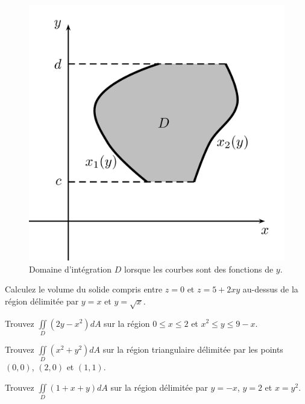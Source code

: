 \documentclass[]{book}
\theoremstyle{definition}
\theoremstyle{definition}
\theoremstyle{definition}
\theoremstyle{remark}
\let\BeginKnitrBlock\begin \let\EndKnitrBlock\end
\begin{document}
\begin{figure}

{\centering \includegraphics[width=0.75\linewidth]{resources/images/latex/itereeY} 

}

\caption{Domaine d'intégration $D$ lorsque les courbes sont des fonctions de $y$.}\label{fig:itereeY}
\end{figure}

\BeginKnitrBlock{example}
\protect\hypertarget{exm:unnamed-chunk-245}{}{\label{exm:unnamed-chunk-245}
}Calculez le volume du solide compris entre \(z=0\) et \(z=5+2xy\)
au-dessus de la région délimitée par \(y=x\) et \(y=\sqrt{x}\).
\EndKnitrBlock{example}
\vspace*{8cm}

\BeginKnitrBlock{example}
\protect\hypertarget{exm:unnamed-chunk-246}{}{\label{exm:unnamed-chunk-246}
}Trouvez \(\iint\limits_D (2y-x^2)dA\) sur la région \(0\leq x\leq 2\)
et \(x^2\leq y \leq 9-x\).
\EndKnitrBlock{example}
\vspace*{8cm}

\BeginKnitrBlock{example}
\protect\hypertarget{exm:unnamed-chunk-247}{}{\label{exm:unnamed-chunk-247}
}Trouvez \(\iint\limits_D (x^2+y^2)dA\) sur la région triangulaire
délimitée par les points \((0,0)\), \((2,0)\) et \((1,1)\).
\EndKnitrBlock{example}
\vspace*{8cm}

\BeginKnitrBlock{example}
\protect\hypertarget{exm:unnamed-chunk-248}{}{\label{exm:unnamed-chunk-248}
}Trouvez \(\iint\limits_D (1+x+y)dA\) sur la région délimitée par
\(y=-x\), \(y=2\) et \(x=y^2\).
\EndKnitrBlock{example}
\vspace*{8cm}
\end{document}
